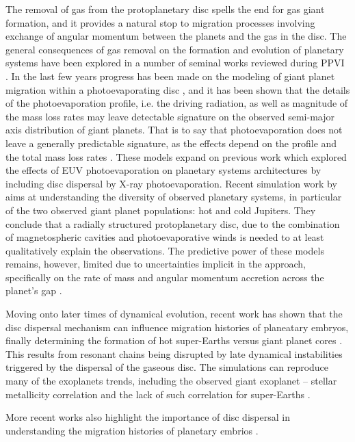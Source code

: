 \documentclass{rsos}
\begin{document}
The removal of gas from the protoplanetary disc  spells the end for gas giant formation, and it provides a natural stop to migration processes involving exchange of angular momentum between the planets and the gas in the disc. The general consequences of  gas removal on the formation and evolution of planetary systems have been explored in a number of seminal works reviewed during PPVI \cite{2014prpl.conf..475A}.  In the last few years progress has been made on the modeling of  giant planet migration within a photoevaporating disc \cite{2015MNRAS.454.2173R}, and it has been shown that the details of the photoevaporation profile, i.e. the driving radiation, as well as  magnitude of the mass loss rates may leave detectable signature on the observed semi-major axis distribution of giant planets. That is to say that photoevaporation does not leave a generally predictable signature, as the effects depend on the profile and the total mass loss rates \cite{2015MNRAS.450.3008E}. These models expand on previous work which explored the effects of EUV photoevaporation on planetary systems architectures \cite{2012MNRAS.422L..82A,2009ApJ...704..989A} by including disc dispersal by X-ray photoevaporation. Recent simulation work by \cite{2016MNRAS.460.2779C} aims at understanding the diversity of observed planetary systems, in particular of the two observed giant planet populations: hot and cold Jupiters. They conclude that a radially structured protoplanetary disc, due to the combination of magnetospheric cavities and photoevaporative winds is needed to at least qualitatively explain the observations. 
The predictive power of these models remains, however, limited due to uncertainties  implicit  in the approach, specifically  on  the rate of mass and angular momentum accretion across the planet's gap 
\cite{2006ApJ...641..526L}.

Moving onto later times of dynamical evolution,  recent work has shown that the disc dispersal mechanism can influence migration histories of planeatary embryos, finally determining the formation of hot super-Earths versus giant planet cores \cite{2014A&A...569A..56C}. This results from resonant chains being disrupted by late dynamical instabilities triggered by the dispersal of the gaseous disc.  The simulations can reproduce many of the exoplanets trends, including the observed giant exoplanet – stellar metallicity correlation and the lack of such correlation for super-Earths \cite{2004A&A...415.1153S,2012Natur.486..375B,2016AJ....152..187M}.

More recent works also highlight the importance of disc dispersal in understanding the migration histories of planetary embrios \cite{2016ApJ...832...83H,2016ApJ...822...90M}.
\end{document}
